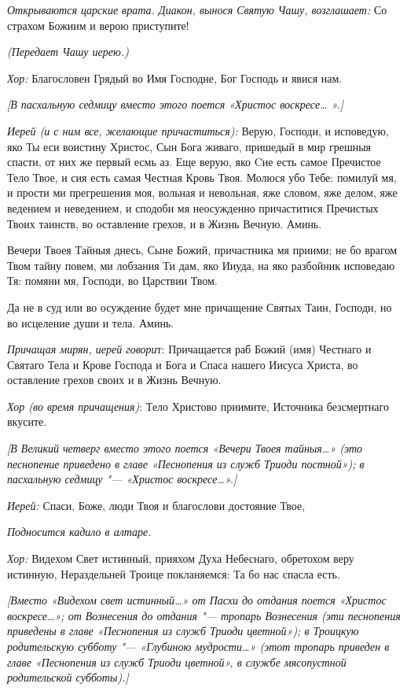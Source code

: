 \begin{mymulticols}
{\itshape Открываются царские врата. Диакон, вынося Святую Чашу, возглашает:} Со страхом Божиим и верою приступите! 

{\itshape (Передает Чашу иерею.) }

{\itshape Хор:} Благословен Грядый во Имя Господне, Бог Господь и явися нам.

{\itshape [В пасхальную седмицу вместо этого поется «Христос воскресе… ».]}

{\itshape Иерей (и с ним все, желающие причаститься):} Верую, Господи, и исповедую, яко Ты еси воистину Христос, Сын Бога живаго, пришедый в мир грешныя спасти, от них же первый есмь аз. Еще верую, яко Cие есть самое Пречистое Тело Твое, и сия есть самая Честная Кровь Твоя. Молюся убо Тебе: помилуй мя, и прости ми прегрешения моя, вольная и невольная, яже словом, яже делом, яже ведением и неведением, и сподоби мя неосужденно причаститися Пречистых Твоих таинств, во оставление грехов, и в Жизнь Вечную. Аминь.

Вечери Твоея Тайныя днесь, Сыне Божий, причастника мя приими; не бо врагом Твом тайну повем, ми лобзания Ти дам, яко Ииуда, на яко разбойник исповедаю Тя: помяни мя, Господи, во Царствии Твом.

Да не в суд или во осуждение будет мне причащение Святых Таин, Господи, но во исцеление души и тела. Аминь.


{\itshape Причащая мирян, иерей говори}т: Причащается раб Божий (имя) Честнаго и Святаго Тела и Крове Господа и Бога и Спаса нашего Иисуса Христа, во оставление грехов своих и в Жизнь Вечную. 

{\itshape Хор (во время причащения)}: Тело Христово приимите, Источника безсмертнаго вкусите.

{\itshape [В Великий четверг вместо этого поется «Вечери Твоея тайныя…» (это песнопение приведено в главе «Песнопения из служб Триоди постной»); в пасхальную седмицу "--- «Христос воскресе…».]}

{\itshape Иерей:} Спаси, Боже, люди Твоя и благослови достояние Твое, 

{\itshape Подносится кадило в алтаре.} 

{\itshape Хор:} Видехом Свет истинный, прияхом Духа Небеснаго, обретохом веру истинную, Нераздельней Троице покланяемся: Та бо нас спасла есть.

{\itshape [Вместо «Видехом свет истинный…» от Пасхи до отдания поется «Христос воскресе…»; от Вознесения до отдания "--- тропарь Вознесения (эти песнопения приведены в главе «Песнопения из служб Триоди цветной»); в Троицкую родительскую субботу "--- «Глубиною мудрости…» (этот тропарь приведен в главе «Песнопения из служб Триоди цветной», в службе мясопустной родительской субботы).]}


\end{mymulticols}
